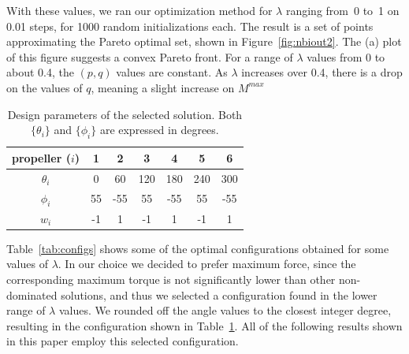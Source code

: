 \documentclass[review]{elsarticle}
\begin{document}
With these values, we ran our optimization method for $\lambda$
ranging from~0 to~1 on 0.01 steps, for 1000 random initializations
each. The result is a set of points approximating the Pareto optimal
set, shown in Figure~\ref{fig:nbiout2}. The (a) plot of this figure
suggests a convex Pareto front. For a range of $\lambda$ values from 0
to about 0.4, the $(p,q)$ values are constant. As $\lambda$ increases
over 0.4, there is a drop on the values of $q$, meaning a slight
increase on $M^{max}$


\begin{table}
  \centering
  \begin{tabular}{ccccccc}
    propeller ($i$) & 1 & 2 & 3 & 4 & 5 & 6 \\
    \hline
    $\theta_i$ & 0 & 60 & 120 & 180 & 240 & 300 \\
    $\phi_i$ & 55 & -55 & 55 & -55 & 55 & -55 \\
    $w_i$ & -1 & 1 & -1 & 1 & -1 & 1 \\
    \hline
  \end{tabular}
  \caption{Design parameters of the selected solution. Both
    $\{\theta_i\}$ and $\{\phi_i\}$ are expressed in degrees.}
  \label{tab:selected}
\end{table}

Table~\ref{tab:configs} shows some of the optimal configurations
obtained for some values of $\lambda$. In our choice we decided to
prefer maximum force,
since the corresponding maximum torque is not significantly
lower than other non-dominated solutions, and thus we selected a configuration found in
the lower range of $\lambda$ values. We rounded off the angle values
to the closest integer degree, resulting in the configuration shown in
Table~\ref{tab:selected}. All of the following results shown in this
paper employ this selected configuration.





\end{document}

